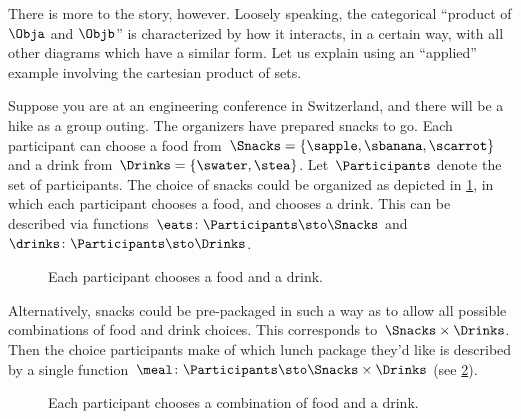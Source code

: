 There is more to the story, however.
Loosely speaking, the categorical ``product of $\Obja$ and $\Objb$'' is characterized by how it interacts, in a certain way, with all other diagrams which have a similar form.
Let us explain using an ``applied'' example involving the cartesian product of sets.

Suppose you are at an engineering conference in Switzerland, and there will be a hike as a group outing.
The organizers have prepared snacks to go.
Each participant can choose a food from~$\Snacks=\{\sapple,\sbanana,\scarrot\}$ and a drink from~$\Drinks=\{\swater,\stea\}$.
Let~$\Participants$ denote the set of participants.
The choice of snacks could be organized as depicted in \cref{fig:snacks_1}, in which each participant chooses a food, and chooses a drink.
This can be described via functions~$\eats \colon \Participants \sto \Snacks$ and~$\drinks \colon  \Participants \sto \Drinks$.

\begin{figure}[h!]
	\centering
	\caption{Each participant chooses a food and a drink.}
	\label{fig:snacks_1}
\end{figure}

Alternatively, snacks could be pre-packaged in such a way as to allow all possible combinations of food and drink choices.
This corresponds to~$\Snacks\times \Drinks$.
Then the choice participants make of which lunch package they'd like is described by a single function~$\meal \colon \Participants\sto \Snacks\times \Drinks$ (see \cref{fig:snacks_2}).

\begin{figure}[h!]
	\centering
	\caption{Each participant chooses a combination of food and a drink. \label{fig:snacks_2}}
\end{figure}


